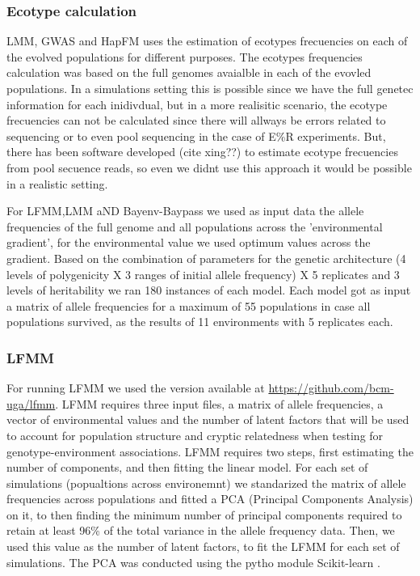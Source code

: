 \documentclass{article}
\begin{document}
\subsubsection{Ecotype calculation}
LMM, GWAS and HapFM uses the estimation of ecotypes frecuencies on each of the evolved populations for different purposes. The ecotypes frequencies calculation was based on the full genomes avaialble in each of the evovled populations. In a simulations setting this is possible since we have the full genetec information for each inidivdual, but in a more realisitic scenario, the ecotype frecuencies can not be calculated since there will allways be errors related to sequencing or to even pool sequencing in the case of E\%R experiments. But, there has been software developed (cite xing??) to estimate ecotype frecuencies from pool secuence reads, so even we didnt use this approach it would be possible in a realistic setting. 

For LFMM,LMM aND Bayenv-Baypass we used as input data the allele frequencies of the full genome and all populations across the 'environmental gradient', for the environmental value we used optimum values across the gradient. Based on the combination of parameters for the genetic architecture (4 levels of polygenicity X 3 ranges of initial allele frequency) X 5 replicates and 3 levels of heritability we ran 180 instances of each model. Each model got as input a matrix of allele frequencies for a maximum of 55 populations in case all populations survived, as the results of 11 environments with 5 replicates each.  

\subsubsection{LFMM}
For running LFMM we used the version available at \url{https://github.com/bcm-uga/lfmm}. LFMM requires three input files, a matrix of allele frequencies, a vector of environmental values and the number of latent factors that will be used to account for population structure and cryptic relatedness when testing for genotype-environment associations. LFMM requires two steps, first estimating the number of components, and then fitting the linear model. For each set of simulations (popualtions across environemnt) we standarized the matrix of allele frequencies across populations and fitted a PCA (Principal Components Analysis) on it, to then finding the minimum number of principal components required to retain at least 96\% of the total variance in the allele frequency data. Then, we used this value as the number of latent factors, to fit the LFMM for each set of simulations. The PCA was conducted using the pytho module Scikit-learn \citep{Pedregosa2011-tp}.
\end{document}
